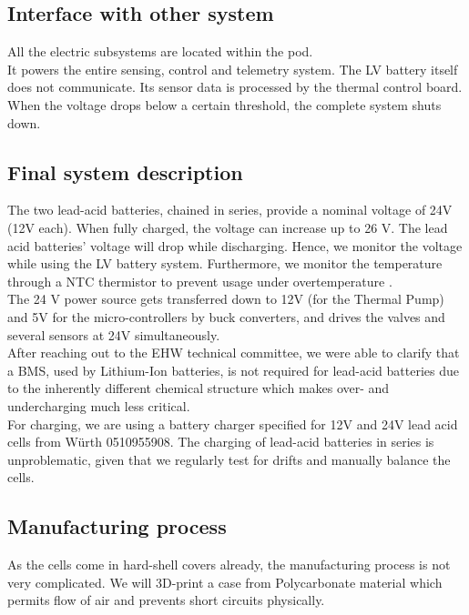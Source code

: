\subsection{Interface with other system}
All the electric subsystems are located within the pod. \\
It powers the entire sensing, control and telemetry system. 
The LV battery itself does not communicate. Its sensor data is processed by the thermal control board.
When the voltage drops below a certain threshold, the complete system shuts down.

\subsection{Final system description}
The two lead-acid batteries, chained in series, provide a nominal voltage of 24V (12V each). When fully charged, the voltage can increase up to 26 V. The lead acid batteries' voltage will drop while discharging. Hence, we monitor the voltage while using the LV battery system. Furthermore, we monitor the temperature through a NTC thermistor to prevent usage under overtemperature . \\
The 24 V power source gets transferred down to 12V (for the Thermal Pump) and 5V for the micro-controllers by buck converters, and drives the valves and several sensors at 24V simultaneously. \\
After reaching out to the EHW technical committee, we were able to clarify that a BMS, used by Lithium-Ion batteries, is not required for lead-acid batteries due to the inherently different chemical structure which makes over- and undercharging much less critical. \\
For charging, we are using a battery charger specified for 12V and 24V lead acid cells from Würth 0510955908. The charging of lead-acid batteries in series is unproblematic, given that we regularly test for drifts and manually balance the cells.\\

\subsection{Manufacturing process}
As the cells come in hard-shell covers already, the manufacturing process is not very complicated. We will 3D-print a case from Polycarbonate material which permits flow of air and prevents short circuits physically.

